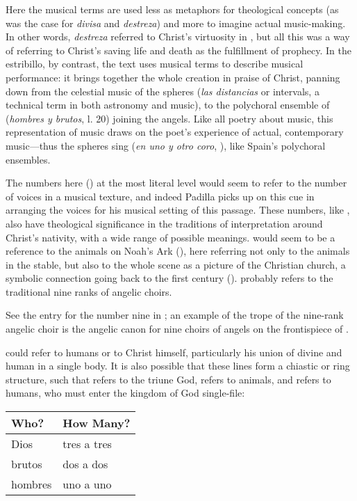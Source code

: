 Here the musical terms are used less as metaphors for theological concepts (as
was the case for \emph{divisa} and \emph{destreza}) and more to imagine actual
music-making.
In other words, \emph{destreza} referred to Christ's virtuosity in
, but all this was a way of
referring to Christ's saving life and death as the fulfillment of prophecy.
In the estribillo, by contrast, the text uses musical terms to describe musical
performance: it brings together the whole creation in praise of Christ, panning
down from the celestial music of the spheres (\emph{las distancias} or
intervals, a technical term in both astronomy and music), to the polychoral
ensemble of  (\emph{hombres y brutos}, l. 20) joining the
angels.
Like all poetry about music, this representation of music draws on the poet's
experience of actual, contemporary music---thus the spheres sing  (\emph{en uno y otro coro}, ), like Spain's
polychoral ensembles.

The numbers here () at the most
literal level would seem to refer to the number of voices in a musical texture,
and indeed Padilla picks up on this cue in arranging the voices for his musical
setting of this passage.
These numbers, like , also have theological
significance in the traditions of interpretation around Christ's nativity, with
a wide range of possible meanings.
 would seem to be a reference to the animals on Noah's Ark
(), here referring not only to the animals in the stable, but
also to the whole scene as a picture of the Christian church, a symbolic
connection going back to the first century ().%
    \Autocite[15]{Augustine:CivitateDei}
 probably refers to the traditional nine ranks of angelic
choirs.%
    \begin{Footnote}
        See the entry for the number nine in \autocite{Bongo:NumerorumMysteria};
        an example of the trope of the nine-rank angelic choir is the angelic
        canon for nine choirs of angels on the frontispiece of
        \autocite{Kircher:Musurgia}.
    \end{Footnote}
 could refer to humans or to Christ himself, particularly his
union of divine and human in a single body.
It is also possible that these lines form a chiastic or ring structure, such
that  refers to the triune God, 
refers to animals, and  refers to humans, who must enter the
kingdom of God single-file:
\begin{center}
    \begin{tabular}{ll}
        \toprule
        Who?    & How Many? \\
        \midrule
        Dios    & tres a tres \\
        brutos  & dos a dos \\
        hombres & uno a uno \\
        \bottomrule
    \end{tabular}
\end{center}

